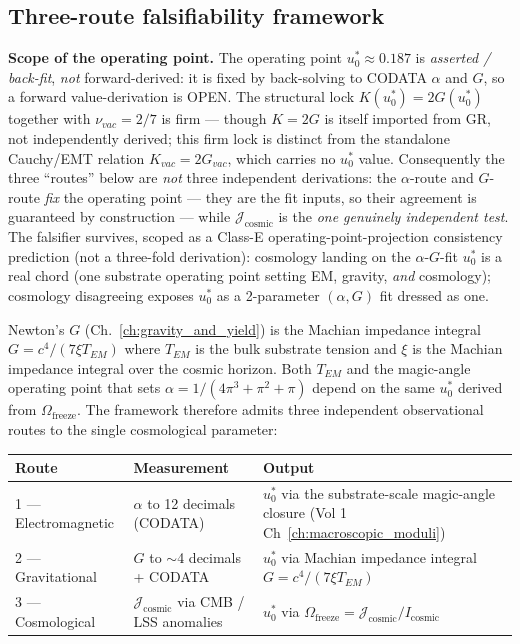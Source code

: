 \subsection{Three-route falsifiability framework}
\label{sec:three_route_falsifiability}

\noindent\textbf{Scope of the operating point.} The operating point $u_0^* \approx 0.187$ is \emph{asserted / back-fit}, \emph{not} forward-derived: it is fixed by back-solving to CODATA $\alpha$ and $G$, so a forward value-derivation is OPEN. The structural lock $K(u_0^*) = 2G(u_0^*)$ together with $\nu_{vac} = 2/7$ is firm --- though $K = 2G$ is itself imported from GR, not independently derived; this firm lock is distinct from the standalone Cauchy/EMT relation $K_{vac} = 2G_{vac}$, which carries no $u_0^*$ value. Consequently the three ``routes'' below are \emph{not} three independent derivations: the $\alpha$-route and $G$-route \emph{fix} the operating point --- they are the fit inputs, so their agreement is guaranteed by construction --- while $\mathcal{J}_{\text{cosmic}}$ is the \emph{one genuinely independent test}. The falsifier survives, scoped as a Class-E operating-point-projection consistency prediction (not a three-fold derivation): cosmology landing on the $\alpha$-$G$-fit $u_0^*$ is a real chord (one substrate operating point setting EM, gravity, \emph{and} cosmology); cosmology disagreeing exposes $u_0^*$ as a 2-parameter $(\alpha, G)$ fit dressed as one.

Newton's $G$ (Ch.~\ref{ch:gravity_and_yield}) is the Machian
impedance integral $G = c^4 / (7\xi T_{EM})$ where $T_{EM}$ is the bulk
substrate tension and $\xi$ is the Machian impedance integral over the
cosmic horizon. Both $T_{EM}$ and the magic-angle operating point that
sets $\alpha = 1/(4\pi^3 + \pi^2 + \pi)$ depend on the same $u_0^*$ derived
from $\Omega_{\text{freeze}}$. The framework therefore admits three
independent observational routes to the single cosmological parameter:

\begin{center}\small
\begin{tabular}{|p{3.2cm}|p{4.5cm}|p{4.5cm}|}
\hline
\textbf{Route} & \textbf{Measurement} & \textbf{Output} \\
\hline
1 --- Electromagnetic & $\alpha$ to 12 decimals (CODATA) & $u_0^*$ via the substrate-scale magic-angle closure (Vol 1 Ch~\ref{ch:macroscopic_moduli}) \\
\hline
2 --- Gravitational & $G$ to $\sim$4 decimals + CODATA & $u_0^*$ via Machian impedance integral $G = c^4 / (7\xi T_{EM})$ \\
\hline
3 --- Cosmological & $\mathcal{J}_{\text{cosmic}}$ via CMB / LSS anomalies & $u_0^*$ via $\Omega_{\text{freeze}} = \mathcal{J}_{\text{cosmic}}/I_{\text{cosmic}}$ \\
\hline
\end{tabular}
\end{center}

